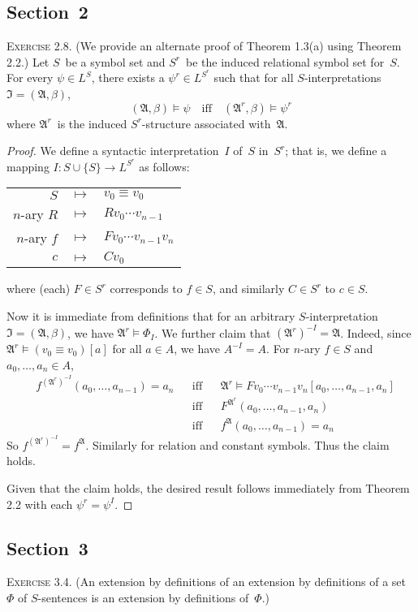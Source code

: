 \documentclass[letterpaper]{article}
\newcommand{\lequ}{\equiv}
\newcommand{\I}{\mathfrak{I}}
\newcommand{\union}{\cup}
\newcommand{\A}{\mathfrak{A}}
\theoremstyle{remark}
\begin{document}
\subsection*{Section~2}
\noindent\textsc{Exercise 2.8.}
(We provide an alternate proof of Theorem 1.3(a) using Theorem 2.2.) Let $S$~be a symbol set and $S^r$~be the induced relational symbol set for~$S$. For every $\psi\in L^S$, there exists a $\psi^r\in L^{S^r}$ such that for all $S$-interpretations $\I=(\A,\beta)$,
$$(\A,\beta)\models\psi\quad\text{iff}\quad(\A^r,\beta)\models\psi^r$$
where $\A^r$~is the induced $S^r$-structure associated with~$\A$.
\begin{proof}
We define a syntactic interpretation~$I$ of~$S$ in~$S^r$; that is, we define a mapping $I:S\union\{S\}\to L^{S^r}$ as follows:
\begin{center}
\begin{tabular}{rcl}
$S$&$\mapsto$&$v_0\lequ v_0$\\
$n$-ary $R$&$\mapsto$&$Rv_0\cdots v_{n-1}$\\
$n$-ary $f$&$\mapsto$&$Fv_0\cdots v_{n-1}v_n$\\
$c$&$\mapsto$&$Cv_0$
\end{tabular}
\end{center}
where (each) $F\in S^r$ corresponds to $f\in S$, and similarly $C\in S^r$ to $c\in S$.

Now it is immediate from definitions that for an arbitrary $S$-interpretation $\I=(\A,\beta)$, we have $\A^r\models\Phi_I$. We further claim that $(\A^r)^{-I}=\A$. Indeed, since $\A^r\models(v_0\lequ v_0)[a]$ for all $a\in A$, we have $A^{-I}=A$. For $n$-ary $f\in S$ and $a_0,\ldots,a_n\in A$,
\begin{align*}
&f^{(\A^r)^{-I}}(a_0,\ldots,a_{n-1})=a_n&&\text{iff}&&\A^r\models Fv_0\cdots v_{n-1}v_n[a_0,\ldots,a_{n-1},a_n]\\
    &&&\text{iff}&&F^{\A^r}(a_0,\ldots,a_{n-1},a_n)\\
    &&&\text{iff}&&f^{\A}(a_0,\ldots,a_{n-1})=a_n
\end{align*}
So $f^{(\A^r)^{-I}}=f^{\A}$. Similarly for relation and constant symbols. Thus the claim holds.

Given that the claim holds, the desired result follows immediately from Theorem 2.2 with each $\psi^r=\psi^I$.
\end{proof}

\subsection*{Section~3}
\noindent\textsc{Exercise 3.4.}
(An extension by definitions of an extension by definitions of a set~$\Phi$ of $S$-sentences is an extension by definitions of~$\Phi$.)
\end{document}
